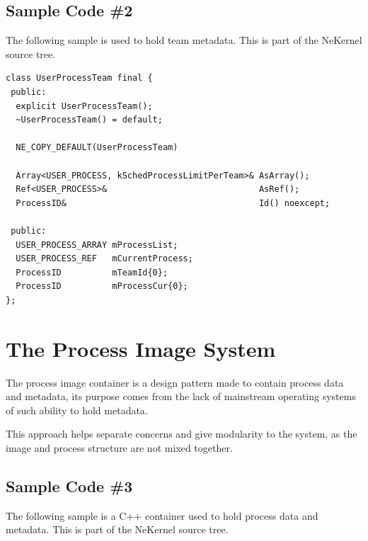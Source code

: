 \documentclass{article}
\begin{document}
\subsection{Sample Code \#2}

{The following sample is used to hold team metadata.} {This is part of the NeKernel source tree.}

\begin{verbatim}
class UserProcessTeam final {
 public:
  explicit UserProcessTeam();
  ~UserProcessTeam() = default;

  NE_COPY_DEFAULT(UserProcessTeam)

  Array<USER_PROCESS, kSchedProcessLimitPerTeam>& AsArray();
  Ref<USER_PROCESS>&                              AsRef();
  ProcessID&                                      Id() noexcept;

 public:
  USER_PROCESS_ARRAY mProcessList;
  USER_PROCESS_REF   mCurrentProcess;
  ProcessID          mTeamId{0};
  ProcessID          mProcessCur{0};
};

\end{verbatim}

\section{The Process Image System}

{The process image container is a design pattern made to contain process data and metadata, its purpose comes from the lack of mainstream operating systems of such ability to hold metadata.}

{This approach helps separate concerns and give modularity to the system, as the image and process structure are not mixed together.}

\subsection{Sample Code \#3}

{The following sample is a C++ container used to hold process data and metadata.} {This is part of the NeKernel source tree.}
\end{document}
